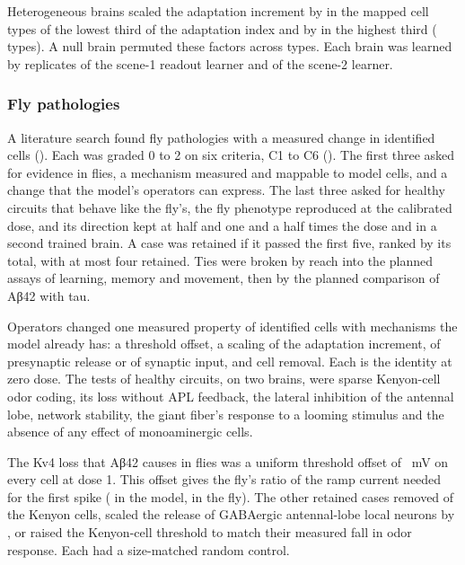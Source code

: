 Heterogeneous brains scaled the adaptation increment by  in the mapped cell types of the lowest third of the
adaptation index and by  in the highest third ( types). A null brain permuted these factors across
types. Each brain was learned by  replicates of the scene-1 readout learner and  of the scene-2 learner.

\subsubsection{Fly pathologies}

A literature search found  fly pathologies with a measured change in identified cells (). Each was graded 0 to
2 on six criteria, C1 to C6 (). The first three asked for evidence in flies, a mechanism measured and mappable to model cells, and a change
that the model's operators can express. The last three asked for healthy circuits that behave like the fly's, the fly
phenotype reproduced at the calibrated dose, and its direction kept at half and one and a half times the dose and in a second
trained brain. A case was retained if it passed the first five, ranked by its total, with at most four retained. Ties were
broken by reach into the planned assays of learning, memory and movement, then by the planned comparison of Aβ42 with tau.

Operators changed one measured property of identified cells with mechanisms the model already has: a threshold offset, a
scaling of the adaptation increment, of presynaptic release or of synaptic input, and cell removal. Each is the identity at
zero dose. The tests of healthy circuits, on two brains, were sparse Kenyon-cell odor coding, its loss
without APL feedback, the lateral inhibition of the antennal lobe, network stability, the
giant fiber's response to a looming stimulus and the absence of any effect of monoaminergic cells.

The Kv4 loss that Aβ42 causes in flies was a uniform threshold offset of ~mV on every cell at
dose 1. This offset gives the fly's ratio of the ramp current needed for the first spike ( in the model,
 in the fly). The other retained cases removed  of the Kenyon cells, scaled the release of GABAergic antennal-lobe local neurons
by , or raised the Kenyon-cell threshold to match their measured fall in odor response. Each had a size-matched random control.

